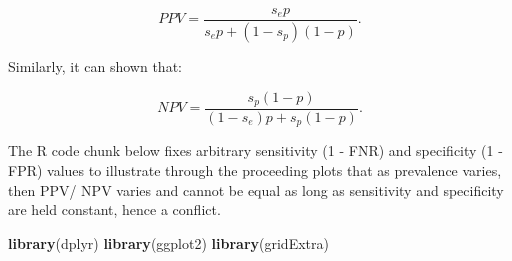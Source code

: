 \documentclass[12pt, twoside]{amherstthesis}
\newenvironment{Shaded}{\begin{snugshade}}{\end{snugshade}}
\newcommand{\FunctionTok}[1]{\textcolor[rgb]{0.13,0.29,0.53}{\textbf{#1}}}
\newcommand{\NormalTok}[1]{#1}
\begin{document}
\[PPV = \frac{s_ep}{s_ep + (1-s_p)(1-p)}.\]

\noindent Similarly, it can shown that:

\[NPV = \frac{s_p(1-p)}{(1-s_e)p + s_p(1-p)}.\]

\noindent The R code chunk below fixes arbitrary sensitivity (1 - FNR) and specificity (1 - FPR) values to illustrate through the proceeding plots that as prevalence varies, then PPV/ NPV varies and cannot be equal as long as sensitivity and specificity are held constant, hence a conflict.
\begin{Shaded}
\begin{Highlighting}[]
\FunctionTok{library}\NormalTok{(dplyr)}
\FunctionTok{library}\NormalTok{(ggplot2)}
\FunctionTok{library}\NormalTok{(gridExtra)}
\end{Highlighting}
\end{Shaded}
\end{document}

